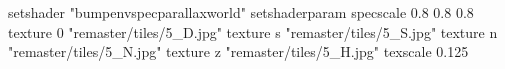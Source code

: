 setshader "bumpenvspecparallaxworld"
setshaderparam specscale 0.8 0.8 0.8
    texture 0 "remaster/tiles/5_D.jpg"
    texture s "remaster/tiles/5_S.jpg"
    texture n "remaster/tiles/5_N.jpg"
    texture z "remaster/tiles/5_H.jpg"
    texscale 0.125